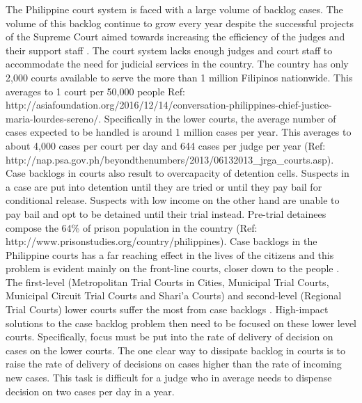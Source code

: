 \documentclass[letterpaper]{article} %
\begin{document}
The Philippine court system is faced with a large volume of backlog cases. The volume of this backlog continue to grow every year despite the successful projects of the Supreme Court aimed towards increasing the efficiency of the judges and their support staff . The court system lacks enough judges and court staff to accommodate the need for judicial services in the country. The country has only 2,000 courts available to serve the more than 1 million Filipinos nationwide. This averages to 1 court per 50,000 people Ref: http://asiafoundation.org/2016/12/14/conversation-philippines-chief-justice-maria-lourdes-sereno/. Specifically in the lower courts, the average number of cases expected to be handled is around 1 million cases per year. This averages to about 4,000 cases per court per day and 644 cases per judge per year (Ref: http://nap.psa.gov.ph/beyondthenumbers/2013/06132013\_jrga\_courts.asp). Case backlogs in courts also result to overcapacity of detention cells. Suspects in a case are put into detention until they are tried or until they pay bail for conditional release. Suspects with low income on the other hand are unable to pay bail and opt to be detained until their trial instead. Pre-trial detainees compose the 64\% of prison population in the country (Ref: http://www.prisonstudies.org/country/philippines). Case backlogs in the Philippine courts has a far reaching effect in the lives of the citizens and this problem is evident mainly on the front-line courts, closer down to the people . The first-level (Metropolitan Trial Courts in Cities, Municipal Trial Courts, Municipal Circuit Trial Courts and Shari'a Courts) and second-level (Regional Trial Courts) lower courts suffer the most from case backlogs . High-impact solutions to the case backlog problem then need to be focused on these lower level courts. Specifically, focus must be put into the rate of delivery of decision on cases on the lower courts. The one clear way to dissipate backlog in courts is to raise the rate of delivery of decisions on cases higher than the rate of incoming new cases. This task is difficult for a judge who in average needs to dispense decision on two cases per day in a year.
\end{document}
